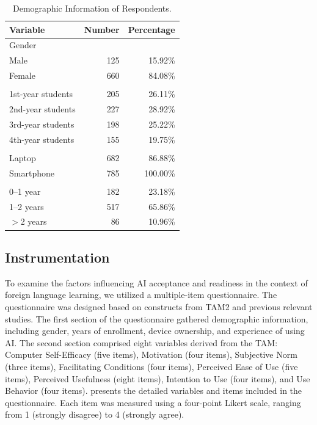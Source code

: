 \documentclass[english]{textolivre}
\begin{document}
\begin{table}[htbp]
\centering
\begin{threeparttable}
\caption{Demographic Information of Respondents.}
\label{tab2}

\begin{tabular}{lrr}
\toprule
Variable &Number & Percentage \\
\midrule
\multicolumn{3}{l}{Gender} \\
Male                     & 125 & 15.92\% \\
Female                   & 660 & 84.08\% \\

\addlinespace
\multicolumn{3}{l}{Class Enrollment} \\
1st-year students        & 205 & 26.11\% \\
2nd-year students        & 227 & 28.92\% \\
3rd-year students        & 198 & 25.22\% \\
4th-year students        & 155 & 19.75\% \\

\addlinespace
\multicolumn{3}{l}{Device Ownership} \\
Laptop                   & 682 & 86.88\% \\
Smartphone               & 785 & 100.00\% \\

\addlinespace
\multicolumn{3}{l}{Experience of Using AI} \\
0--1 year                & 182 & 23.18\% \\
1--2 years               & 517 & 65.86\% \\
$>$2 years               & 86  & 10.96\% \\
\bottomrule
\end{tabular}

\end{threeparttable}
\end{table}

\subsection{Instrumentation}\label{sec-organizacao}
To examine the factors influencing AI acceptance and readiness in the context of foreign language learning, we utilized a multiple-item questionnaire. The questionnaire was designed based on constructs from TAM2 and previous relevant studies. The first section of the questionnaire gathered demographic information, including gender, years of enrollment, device ownership, and experience of using AI. The second section comprised eight variables derived from the TAM: Computer Self-Efficacy (five items), Motivation (four items), Subjective Norm (three items), Facilitating Conditions (four items), Perceived Ease of Use (five items), Perceived Usefulness (eight items), Intention to Use (four items), and Use Behavior (four items).  presents the detailed variables and items included in the questionnaire. Each item was measured using a four-point Likert scale, ranging from 1 (strongly disagree) to 4 (strongly agree).
\end{document}
